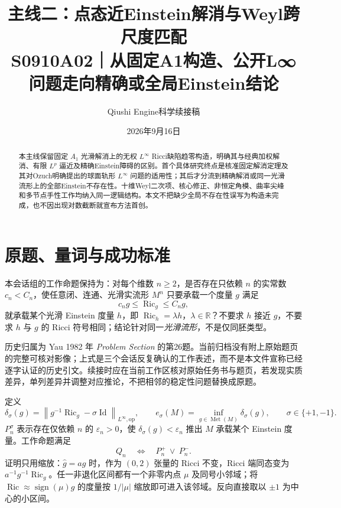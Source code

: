 \documentclass[UTF8,a4paper,11pt,fontset=fandol]{ctexart}
\title{主线二：点态近Einstein解消与Weyl跨尺度匹配\\[0.5em]{\large S0910A02｜从固定A1构造、公开L∞问题走向精确或全局Einstein结论}}
\author{Qiushi Engine\quad 科学续接稿}
\date{2026年9月16日}
\numberwithin{equation}{section}
\theoremstyle{definition}
\newcommand{\Ric}{\operatorname{Ric}}
\newcommand{\Met}{\operatorname{Met}}
\newcommand{\Id}{\operatorname{Id}}
\newcommand{\op}{\mathrm{op}}
\newcommand{\R}{\mathbb R}
\newcommand{\norm}[1]{\left\lVert#1\right\rVert}
\begin{document}
\maketitle
\begin{abstract}
本主线保留固定 $A_1$ 光滑解消上的无权 $L^\infty$ Ricci缺陷趋零构造，明确其与经典加权解消、有限 $L^p$ 逼近及精确Einstein障碍的区别。首个具体研究终点是核准固定解消定理及其对Ozuch明确提出的球面轨形 $L^\infty$ 问题的适用性；其后才分流到精确解消或同一光滑流形上的全部Einstein不存在性。十维Weyl二次项、核心修正、非恒定角模、曲率尖峰和多节点手性工作均纳入同一逻辑结构。本文不把缺少全局不存在性误写为构造未完成，也不因出现对数截断就宣布方法首创。
\end{abstract}
\begingroup
\small\linespread{1.0}\selectfont\setlength{\parskip}{0pt}
\tableofcontents
\endgroup
\clearpage

\section{原题、量词与成功标准}
本会话组的工作命题保持为：对每个维数 $n\ge2$，是否存在只依赖 $n$ 的实常数 $c_n<C_n$，使任意闭、连通、光滑实流形 $M^n$ 只要承载一个度量 $g$ 满足
\begin{equation}\label{eq:Q}
 c_ng\le\Ric_g\le C_ng,
\end{equation}
就承载某个光滑 Einstein 度量 $h$，即 $\Ric_h=\lambda h$，$\lambda\in\R$？不要求 $h$ 接近 $g$，不要求 $h$ 与 $g$ 的 Ricci 符号相同；结论针对同一\emph{光滑流形}，不是仅同胚类型。

历史归属为 Yau 1982 年 \emph{Problem Section} 的第26题\cite{Yau1982}。当前归档没有附上原始题页的完整可核对影像；上式是三个会话反复确认的工作表述，而不是本文件宣称已经逐字认证的历史引文。续接时应在当前工作区核对原始任务书与题页，若发现实质差异，单列差异并调整对应推论，不把相邻的稳定性问题替换成原题。

定义
\begin{equation}\label{eq:defect}
 \delta_\sigma(g)=\norm{g^{-1}\Ric_g-\sigma\Id}_{L^\infty,\op},\qquad
 e_\sigma(M)=\inf_{g\in\Met(M)}\delta_\sigma(g),\qquad \sigma\in\{+1,-1\}.
\end{equation}
$P_n^\sigma$ 表示存在仅依赖 $n$ 的 $\varepsilon_n>0$，使 $\delta_\sigma(g)<\varepsilon_n$ 推出 $M$ 承载某个 Einstein 度量。工作命题满足
\begin{equation}\label{eq:branches}
 Q_n\quad\Longleftrightarrow\quad P_n^+\ \lor\ P_n^-.
\end{equation}
证明只用缩放：$\widehat g=ag$ 时，作为 $(0,2)$ 张量的 Ricci 不变，Ricci 端同态变为 $a^{-1}g^{-1}\Ric_g$。任一非退化区间都有一个非零内点 $\mu$ 及同号小邻域；将 $\Ric\approx\operatorname{sign}(\mu)g$ 的度量按 $1/|\mu|$ 缩放即可进入该邻域。反向直接取以 $\pm1$ 为中心的小区间。
\end{document}

